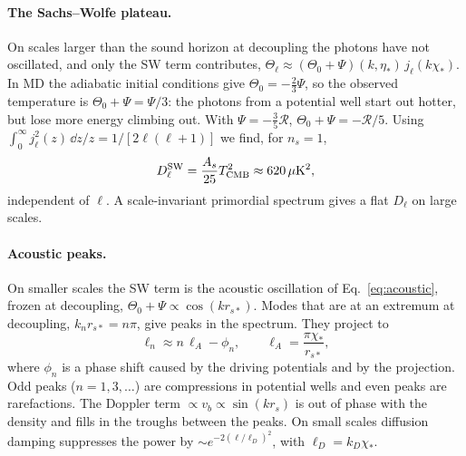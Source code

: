 \paragraph*{The Sachs--Wolfe plateau.} On scales larger than the sound horizon at decoupling the photons have not
oscillated, and only the SW term contributes, $\Theta_\ell\approx(\Theta_0+\Psi)(k,\eta_*)\,j_\ell(k\chi_*)$. In MD the
adiabatic initial conditions give $\Theta_0=-\tfrac23\Psi$, so the observed temperature is $\Theta_0+\Psi=\Psi/3$: the
photons from a potential well start out hotter, but lose more energy climbing out. With $\Psi=-\tfrac35\mathcal{R}$,
$\Theta_0+\Psi=-\mathcal{R}/5$. Using $\int_0^\infty j_\ell^2(z)\,\dd z/z=1/[2\ell(\ell+1)]$ we find, for $n_s=1$,
\begin{equation}
D_\ell^{\rm SW} = \frac{A_s}{25}T_{\rm CMB}^2 \approx 620\,\mu\mathrm{K}^2,
\label{eq:SWplateau}
\end{equation}
independent of $\ell$. A scale-invariant primordial spectrum gives a flat $D_\ell$ on large scales.

\paragraph*{Acoustic peaks.} On smaller scales the SW term is the acoustic oscillation of Eq.~\eqref{eq:acoustic},
frozen at decoupling, $\Theta_0+\Psi\propto\cos(kr_{s*})$. Modes that are at an extremum at decoupling,
$k_nr_{s*}=n\pi$, give peaks in the spectrum. They project to
\begin{equation}
\ell_n\approx n\,\ell_A - \phi_n,\qquad \ell_A=\frac{\pi\chi_*}{r_{s*}},
\label{eq:lA}
\end{equation}
where $\phi_n$ is a phase shift caused by the driving potentials and by the projection. Odd peaks ($n=1,3,\dots$) are
compressions in potential wells and even peaks are rarefactions. The Doppler term $\propto v_b\propto\sin(kr_s)$ is
out of phase with the density and fills in the troughs between the peaks. On small scales diffusion damping suppresses
the power by $\sim e^{-2(\ell/\ell_D)^2}$, with $\ell_D=k_D\chi_*$.

